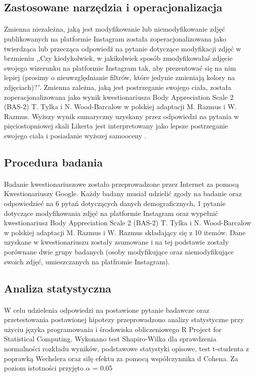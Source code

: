 \documentclass[12pt,a4paper,final,oneside,onecolumn,titlepage]{article}
\begin{document}
\subsection*{\normalsize{\textbf{Zastosowane narzędzia i operacjonalizacja}}}
\paragraph{}
Zmienna niezależna, jaką jest modyfikowanie lub niemodyfikowanie zdjęć publikowanych na platformie Instagram została zoperacjonalizowana jako twierdząca lub przecząca odpowiedź na pytanie dotyczące modyfikacji zdjęć w brzmieniu ,,Czy kiedykolwiek, w jakikolwiek sposób zmodyfikowałaś zdjęcie swojego wizerunku na platformie Instagram tak, aby prezentować się na nim lepiej (prosimy o nieuwzględnianie filtrów, które jedynie zmieniają kolory na zdjęciach)?''. Zmienna zależna, jaką jest postrzeganie swojego ciała, została zoperacjonalizowana jako wynik kwestionariusza Body Appreciation Scale 2 (BAS-2) T. Tylka i N. Wood-Barcalow w polskiej adaptacji M. Razmus i W. Razmus. Wyższy wynik sumaryczny uzyskany przez odpowiedzi na pytania w pięciostopniowej skali Likerta jest interpretowany jako lepsze postrzeganie swojego ciała i posiadanie wyższej samooceny \citep{razmus_evaluating_2017,tylka_body_2015}.
\subsection*{\normalsize{\textbf{Procedura badania}}}
\paragraph{}
Badanie kwestionariuszowe zostało przeprowadzone przez Internet za pomocą Kwestionariuszy Google. Każdy badany musiał udzielić zgody na badanie oraz odpowiedzieć na 6 pytań dotyczących danych demograficznych, 1 pytanie dotyczące modyfikowania zdjęć na platformie Instagram oraz wypełnić kwestionariusz Body Appreciation Scale 2 (BAS-2) T. Tylka i N. Wood-Barcalow w polskiej adaptacji M. Razmus i W. Razmus składający się z 10 itemów. Dane uzyskane w kwestionariuszu zostały zsumowane i na tej podstawie zostały porównane dwie grupy badanych (osoby modyfikujące oraz niemodyfikujące swoich zdjęć, umieszczanych na platfromie Instagram).
\subsection*{\normalsize{\textbf{Analiza statystyczna}}}
\paragraph{}
W celu udzielenia odpowiedzi na postawione pytanie badawcze oraz przetestowania postawionej hipotezy przeprowadzono analizy statystyczne przy użyciu języka programowania i środowiska obliczeniowego R Project for Statistical Computing. Wykonano test Shapiro-Wilka dla sprawdzenia normalności rozkładu wyników, podstawowe statystyki opisowe, test t-studenta z poprawką Wechslera oraz siłę efektu za pomocą współczynnika d Cohena. Za poziom istotności przyjęto $\alpha$ = 0.05
\newpage

\end{document}
